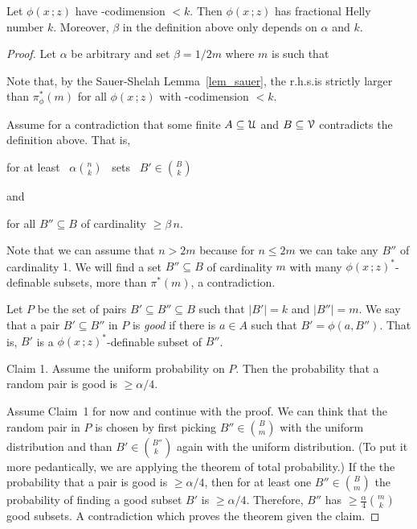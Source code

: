 \documentclass[scombinatorics.tex]{subfiles}
\begin{document}

\begin{theorem}[(Matou\v{s}ek)]\label{thm_matousek}
Let  $\phi(x\,;z)$ have \vc-codimension $<k$.
Then $\phi(x\,;z)$ has fractional Helly number $k$.
Moreover, $\beta$ in the definition above only depends on $\alpha$ and $k$.
\end{theorem}

\begin{proof}
Let $\alpha$ be arbitrary and set $\beta=1/2m$ where $m$ is such that 


Note that, by the Sauer-Shelah Lemma~\ref{lem_sauer}, the r.h.s.\@ is strictly larger than $\pi^*_\phi(m)$ for all $\phi(x\,;z)$ with \vc-codimension $<k$.

Assume for a contradiction that some finite $A\subseteq\EuScript U$ and $B\subseteq\EuScript V$ contradicts the definition above.
That is,
 
\hfill for at least \ $\displaystyle\alpha{n\choose k}$ \ sets \ $\displaystyle B'\in{B\choose k}$

and

\hfill for all $B''\subseteq B$ of cardinality $\ge\beta\,n$.

Note that we can assume that $n>2m$ because for $n\le2m$ we can take any $B''$ of cardinality $1$.
We will find a set $B''\subseteq B$ of cardinality $m$ with many $\phi(x\,;z)^*$-definable subsets, more than $\pi^*(m)$, a contradiction.

Let $P$ be the set of pairs $B'\subseteq B''\subseteq B$ such that $|B'|=k$ and $|B''|=m$.
We say that a pair $B'\subseteq B''$ in $P$ is \textit{good\/} if there is $a\in A$ such that $B'=\phi(a,B'')$.
That is, $B'$ is a $\phi(x\,;z)^*$-definable subset of $B''$.

Claim 1. Assume the uniform probability on $P$.
Then the probability that a random pair is good is $\ge\alpha/4$.

Assume Claim~1 for now and continue with the proof.
We can think that the random pair in $P$ is chosen by first picking $B''\in{B\choose m}$ with the uniform distribution and than $B'\in{B''\choose k\phantom{'}}$ again with the uniform distribution. 
(To put it more pedantically, we are applying the theorem of total probability.)
If the the probability that a pair is good is $\ge\alpha/4$, then for at least one $B''\in{B\choose m}$ the probability of finding a good subset $B'$ is $\ge\alpha/4$.
Therefore, $B''$ has $\ge\frac\alpha4{m\choose k}$ good subsets.
A contradiction which proves the theorem given the claim.


\end{proof}
\end{document}
